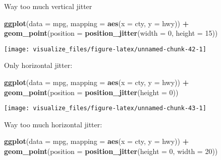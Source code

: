 \documentclass[]{book}
\newenvironment{Shaded}{\begin{snugshade}}{\end{snugshade}}
\newcommand{\DataTypeTok}[1]{\textcolor[rgb]{0.13,0.29,0.53}{#1}}
\newcommand{\DecValTok}[1]{\textcolor[rgb]{0.00,0.00,0.81}{#1}}
\newcommand{\KeywordTok}[1]{\textcolor[rgb]{0.13,0.29,0.53}{\textbf{#1}}}
\newcommand{\NormalTok}[1]{#1}
\newcommand{\OperatorTok}[1]{\textcolor[rgb]{0.81,0.36,0.00}{\textbf{#1}}}
\newcommand{\StringTok}[1]{\textcolor[rgb]{0.31,0.60,0.02}{#1}}
\theoremstyle{plain}
\theoremstyle{remark}
\theoremstyle{definition}
\theoremstyle{definition}
\theoremstyle{definition}
\theoremstyle{remark}
\begin{document}
Way too much vertical jitter

\begin{Shaded}
\begin{Highlighting}[]
\KeywordTok{ggplot}\NormalTok{(}\DataTypeTok{data =}\NormalTok{ mpg, }\DataTypeTok{mapping =} \KeywordTok{aes}\NormalTok{(}\DataTypeTok{x =}\NormalTok{ cty, }\DataTypeTok{y =}\NormalTok{ hwy)) }\OperatorTok{+}
\StringTok{  }\KeywordTok{geom_point}\NormalTok{(}\DataTypeTok{position =} \KeywordTok{position_jitter}\NormalTok{(}\DataTypeTok{width =} \DecValTok{0}\NormalTok{, }\DataTypeTok{height =} \DecValTok{15}\NormalTok{))}
\end{Highlighting}
\end{Shaded}

\begin{center}\texttt{[image: visualize\_files/figure-latex/unnamed-chunk-42-1]} \end{center}

Only horizontal jitter:

\begin{Shaded}
\begin{Highlighting}[]
\KeywordTok{ggplot}\NormalTok{(}\DataTypeTok{data =}\NormalTok{ mpg, }\DataTypeTok{mapping =} \KeywordTok{aes}\NormalTok{(}\DataTypeTok{x =}\NormalTok{ cty, }\DataTypeTok{y =}\NormalTok{ hwy)) }\OperatorTok{+}
\StringTok{  }\KeywordTok{geom_point}\NormalTok{(}\DataTypeTok{position =} \KeywordTok{position_jitter}\NormalTok{(}\DataTypeTok{height =} \DecValTok{0}\NormalTok{))}
\end{Highlighting}
\end{Shaded}

\begin{center}\texttt{[image: visualize\_files/figure-latex/unnamed-chunk-43-1]} \end{center}

Way too much horizontal jitter:

\begin{Shaded}
\begin{Highlighting}[]
\KeywordTok{ggplot}\NormalTok{(}\DataTypeTok{data =}\NormalTok{ mpg, }\DataTypeTok{mapping =} \KeywordTok{aes}\NormalTok{(}\DataTypeTok{x =}\NormalTok{ cty, }\DataTypeTok{y =}\NormalTok{ hwy)) }\OperatorTok{+}
\StringTok{  }\KeywordTok{geom_point}\NormalTok{(}\DataTypeTok{position =} \KeywordTok{position_jitter}\NormalTok{(}\DataTypeTok{height =} \DecValTok{0}\NormalTok{, }\DataTypeTok{width =} \DecValTok{20}\NormalTok{))}
\end{Highlighting}
\end{Shaded}
\end{document}
